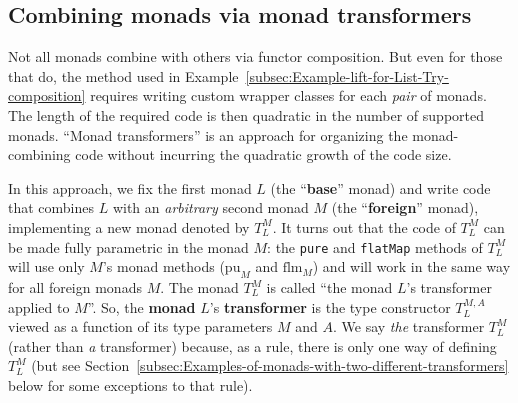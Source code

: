 \subsection{Combining monads via monad transformers}

Not all monads combine with others via functor composition. But even
for those that do, the method used in Example~\ref{subsec:Example-lift-for-List-Try-composition}
requires writing custom wrapper classes for each\emph{ pair} of monads.
The length of the required code is then quadratic in the number of
supported monads. \textsf{``}Monad transformers\textsf{''} is an approach for organizing
the monad-combining code without incurring the quadratic growth of
the code size.

In this approach, we fix the first monad $L$ (the \textsf{``}\textbf{base}\textsf{''}
monad) and write code that combines $L$ with an \emph{arbitrary}
second monad $M$ (the \textsf{``}\textbf{foreign}\textsf{''} monad), implementing
a new monad denoted by $T_{L}^{M}$. It turns out that the code of
$T_{L}^{M}$ can be made fully parametric in the monad $M$: the \lstinline!pure!
and \lstinline!flatMap! methods of $T_{L}^{M}$ will use only $M$\textsf{'}s
monad methods ($\text{pu}_{M}$ and $\text{flm}_{M}$) and will work
in the same way for all foreign monads $M$. The monad $T_{L}^{M}$
is called \textsf{``}the monad $L$\textsf{'}s transformer applied to $M$\textsf{''}. So,
the \textbf{monad} $L$\textsf{'}s\textbf{ transformer} is
the type constructor $T_{L}^{M,A}$ viewed as a function of its type
parameters $M$ and $A$. We say \emph{the} transformer $T_{L}^{M}$
(rather than \emph{a} transformer) because, as a rule, there is only
one way of defining $T_{L}^{M}$ (but see Section~\ref{subsec:Examples-of-monads-with-two-different-transformers}
below for some exceptions to that rule).

